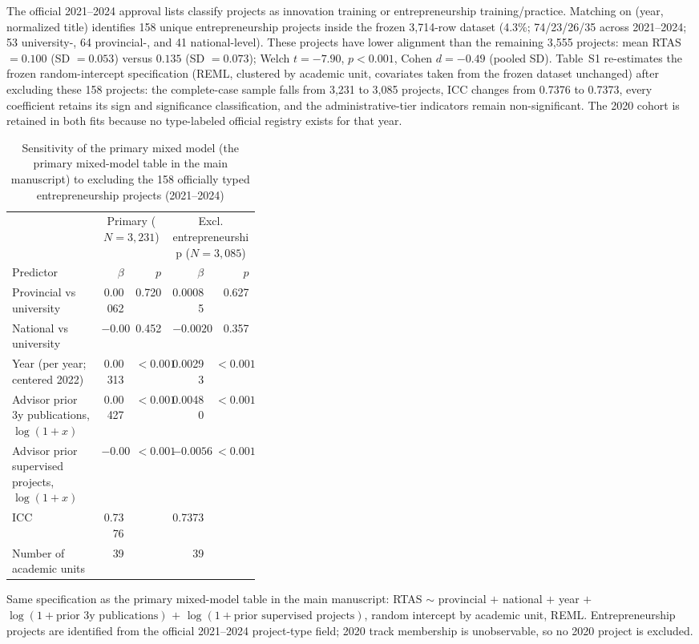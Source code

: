 \documentclass[a4paper,11pt]{article}
\begin{document}

The official 2021--2024 approval lists classify projects as innovation training or entrepreneurship training/practice. Matching on (year, normalized title) identifies 158 unique entrepreneurship projects inside the frozen 3,714-row dataset (4.3\%; 74/23/26/35 across 2021--2024; 53 university-, 64 provincial-, and 41 national-level). These projects have lower alignment than the remaining 3,555 projects: mean RTAS $=0.100$ (SD $=0.053$) versus $0.135$ (SD $=0.073$); Welch $t=-7.90$, $p<0.001$, Cohen $d=-0.49$ (pooled SD). Table~S1 re-estimates the frozen random-intercept specification (REML, clustered by academic unit, covariates taken from the frozen dataset unchanged) after excluding these 158 projects: the complete-case sample falls from 3,231 to 3,085 projects, ICC changes from 0.7376 to 0.7373, every coefficient retains its sign and significance classification, and the administrative-tier indicators remain non-significant. The 2020 cohort is retained in both fits because no type-labeled official registry exists for that year.

\begin{table}[htbp]
\centering
\caption{Sensitivity of the primary mixed model (the primary mixed-model table in the main manuscript) to excluding the 158 officially typed entrepreneurship projects (2021--2024)}
\label{tab:s1}
\small
\begin{tabular}{p{0.36\linewidth}rrrr}
\toprule
& \multicolumn{2}{c}{Primary ($N=3{,}231$)} & \multicolumn{2}{c}{Excl. entrepreneurship ($N=3{,}085$)}\\
\cmidrule(lr){2-3}\cmidrule(lr){4-5}
Predictor & $\beta$ & $p$ & $\beta$ & $p$\\
\midrule
Provincial vs university & 0.00062 & 0.720 & 0.00085 & 0.627\\
National vs university & $-0.00162$ & 0.452 & $-0.00205$ & 0.357\\
Year (per year; centered 2022) & 0.00313 & $<0.001$ & 0.00293 & $<0.001$\\
Advisor prior 3y publications, $\log(1+x)$ & 0.00427 & $<0.001$ & 0.00480 & $<0.001$\\
Advisor prior supervised projects, $\log(1+x)$ & $-0.00629$ & $<0.001$ & $-0.00567$ & $<0.001$\\
\midrule
ICC & 0.7376 & & 0.7373 & \\
Number of academic units & 39 & & 39 & \\
\bottomrule
\end{tabular}

\vspace{1mm}
\footnotesize Same specification as the primary mixed-model table in the main manuscript: RTAS $\sim$ provincial $+$ national $+$ year $+$ $\log(1+\text{prior 3y publications})$ $+$ $\log(1+\text{prior supervised projects})$, random intercept by academic unit, REML. Entrepreneurship projects are identified from the official 2021--2024 project-type field; 2020 track membership is unobservable, so no 2020 project is excluded.
\end{table}
\end{document}
